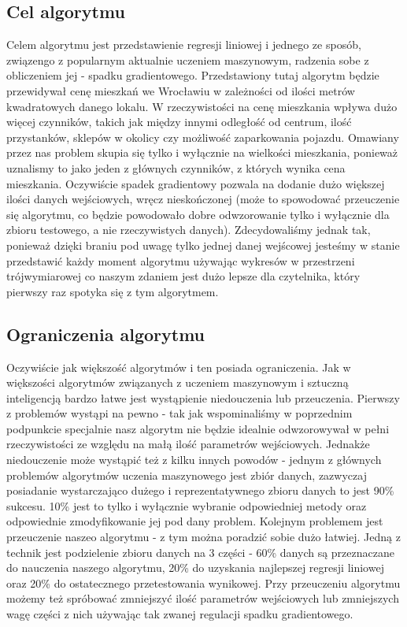 	\subsection{Cel algorytmu}
Celem algorytmu jest przedstawienie regresji liniowej i jednego ze sposób, związengo z popularnym aktualnie uczeniem maszynowym, radzenia sobe z obliczeniem jej - spadku gradientowego. Przedstawiony tutaj algorytm będzie przewidywał cenę mieszkań we Wrocławiu w zależności od ilości metrów kwadratowych danego lokalu. W rzeczywistości na cenę mieszkania wpływa dużo więcej czynników, takich jak między innymi odległość od centrum, ilość przystanków, sklepów w okolicy czy możliwość zaparkowania pojazdu. Omawiany przez nas problem skupia się tylko i wyłącznie na wielkości mieszkania, ponieważ uznalismy to jako jeden z głównych czynników, z których wynika cena mieszkania. Oczywiście spadek gradientowy pozwala na dodanie dużo większej ilości danych wejściowych, wręcz nieskończonej (może to spowodować przeuczenie się algorytmu, co będzie powodowało dobre odwzorowanie tylko i wyłącznie dla zbioru testowego, a nie rzeczywistych danych). Zdecydowaliśmy jednak tak, ponieważ dzięki braniu pod uwagę tylko jednej danej wejścowej jesteśmy w stanie przedstawić każdy moment algorytmu używając wykresów w przestrzeni trójwymiarowej co naszym zdaniem jest dużo lepsze dla czytelnika, który pierwszy raz spotyka się z tym algorytmem.
	\subsection{Ograniczenia algorytmu}
Oczywiście jak większość algorytmów i ten posiada ograniczenia. Jak w większości algorytmów związanych z uczeniem maszynowym i sztuczną inteligencją bardzo łatwe jest wystąpienie niedouczenia lub przeuczenia. Pierwszy z problemów wystąpi na pewno - tak jak wspominaliśmy w poprzednim podpunkcie specjalnie nasz algorytm nie będzie idealnie odwzorowywał w pełni rzeczywistości ze względu na małą ilość parametrów wejściowych. Jednakże niedouczenie może wystąpić też z kilku innych powodów - jednym z głównych problemów algorytmów uczenia maszynowego jest zbiór danych, zazwyczaj posiadanie wystarczająco dużego i reprezentatywnego zbioru danych to jest 90\% sukcesu. 10\% jest to tylko i wyłącznie wybranie odpowiedniej metody oraz odpowiednie zmodyfikowanie jej pod dany problem. Kolejnym problemem jest przeuczenie naszeo algorytmu - z tym można poradzić sobie dużo łatwiej. Jedną z technik jest podzielenie zbioru danych na 3 części - 60\% danych są przeznaczane do nauczenia naszego algorytmu, 20\% do uzyskania najlepszej regresji liniowej oraz 20\% do ostatecznego przetestowania wynikowej. Przy przeuczeniu algorytmu możemy też spróbować zmniejszyć ilość parametrów wejściowych lub zmniejszych wagę części z nich używając tak zwanej regulacji spadku gradientowego. 